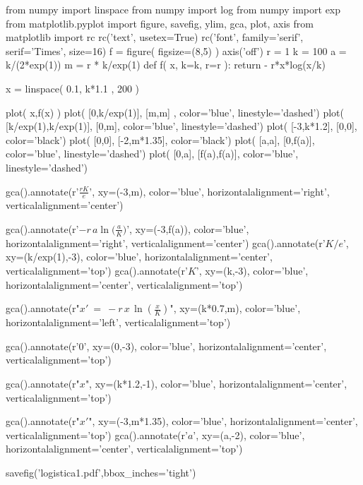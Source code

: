 \documentclass[12pt,twoside,a4paper]{article}
\begin{document}
\begin{pycode}
from numpy import linspace
from numpy import log
from numpy import exp
from matplotlib.pyplot import figure, savefig, ylim, gca, plot, axis
from matplotlib import rc
rc('text', usetex=True)
rc('font', family='serif', serif='Times', size=16)
f = figure( figsize=(8,5) )
axis('off')
r = 1
k = 100
a = k/(2*exp(1))
m = r * k/exp(1)
def f( x, k=k, r=r ):
    return - r*x*log(x/k)

x   = linspace( 0.1, k*1.1 , 200 )


plot( x,f(x) )
plot( [0,k/exp(1)], [m,m] ,  color='blue', linestyle='dashed')
plot( [k/exp(1),k/exp(1)], [0,m], color='blue', linestyle='dashed')
plot(  [-3,k*1.2], [0,0], color='black')
plot(  [0,0], [-2,m*1.35], color='black')
plot( [a,a], [0,f(a)], color='blue', linestyle='dashed')
plot( [0,a], [f(a),f(a)], color='blue', linestyle='dashed')

gca().annotate(r'$\frac{rK}{e}$', 
                    xy=(-3,m), 
                    color='blue', 
                    horizontalalignment='right',  
                    verticalalignment='center')
                    
gca().annotate(r'$-r\,a\ln\!\big(\frac{a}{K}\big)$', 
                    xy=(-3,f(a)), 
                    color='blue', 
                    horizontalalignment='right',  
                    verticalalignment='center')
gca().annotate(r'$K/e$', 
                    xy=(k/exp(1),-3), 
                    color='blue', 
                    horizontalalignment='center',  
                    verticalalignment='top')
gca().annotate(r'$K$', 
                    xy=(k,-3), 
                    color='blue', 
                    horizontalalignment='center',  
                    verticalalignment='top')
                    
gca().annotate(r"$\displaystyle x'\ =\ - r\,x\,\ln\left(\frac{x}{K}\right)$", 
                    xy=(k*0.7,m), 
                    color='blue', 
                    horizontalalignment='left',  
                    verticalalignment='top') 
                    
gca().annotate(r'$0$', 
                    xy=(0,-3), 
                    color='blue', 
                    horizontalalignment='center',  
                    verticalalignment='top')        
           
gca().annotate(r"$x$", 
                    xy=(k*1.2,-1), 
                    color='blue', 
                    horizontalalignment='center',  
                    verticalalignment='top')                   
 
gca().annotate(r"$x'$", 
                    xy=(-3,m*1.35), 
                    color='blue', 
                    horizontalalignment='center',  
                    verticalalignment='top')
gca().annotate(r'$a$', 
                    xy=(a,-2), 
                    color='blue', 
                    horizontalalignment='center',  
                    verticalalignment='top')             
                    
                    
savefig('logistica1.pdf',bbox_inches='tight')
\end{pycode}
\end{document}
